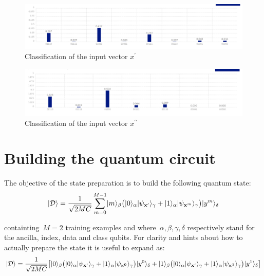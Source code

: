 \documentclass{article}
\DeclarePairedDelimiter\ket{\lvert}{\rangle}
\begin{document}
\begin{figure}
\includegraphics[width=\textwidth]{x0_class0_classification.png}
\centering
\caption{Classification of the input vector $x^\prime$}
\end{figure}

\begin{figure}
\includegraphics[width=\textwidth]{x1_class0_classification.png}
\centering
\caption{Classification of the input vector $x^{\prime \prime}$}
\end{figure}


\section{Building the quantum circuit}

\noindent The objective of the state preparation is to build the following quantum state:
\begin{equation}
\ket{\mathcal{D}} = \frac{1}{\sqrt{2 M C}} \sum_{m=0}^{M-1} \ket{m}_{\beta} \big( \ket{0}_{\alpha} \ket{\psi_{\bf x^{\prime}}}_{\gamma} + \ket{1}_{\alpha} \ket{\psi_{{\bf x}^m}}_{\gamma} \big) \ket{y^m}_{\delta}
\end{equation}

\noindent containting~$M=2$ training examples and where~$\alpha, \beta, \gamma, \delta$ respectively stand for the ancilla, index, data and class qubits. For clarity and hints about how to actually prepare the state it is useful to expand as:
\begin{equation*}
\ket{\mathcal{D}} = \frac{1}{\sqrt{2 M C}} \big[ \ket{0}_\beta \big( \ket{0}_{\alpha} \ket{\psi_{\bf x^{\prime}}}_{\gamma} + \ket{1}_{\alpha} \ket{\psi_{\bf{x}^0}}_{\gamma} \big) \ket{y^0}_\delta + \ket{1}_\beta \big( \ket{0}_{\alpha} \ket{\psi_{\bf x^{\prime}}}_{\gamma} + \ket{1}_{\alpha} \ket{\psi_{\bf{x}^1}}_{\gamma} \big) \ket{y^1}_\delta  \big]
\end{equation*}
\end{document}
